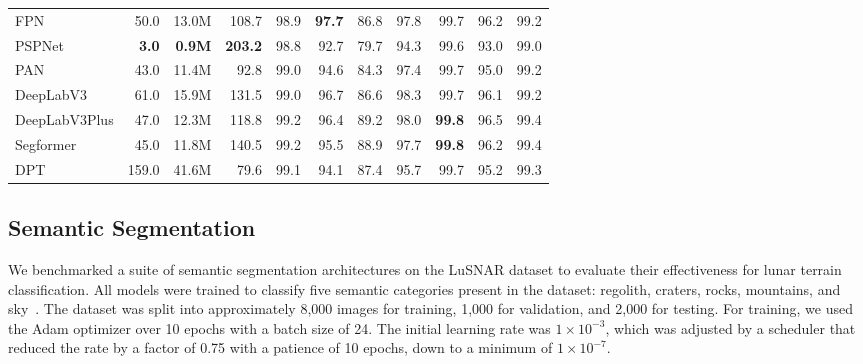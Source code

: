 \begin{table*}[h!]
\begin{tabular}{|l rrrrrrrrrr|}
		FPN                                                          & 50.0          & 13.0M         &
		108.7                                                        & 98.9          & \textbf{97.7} & 86.8          & 97.8          & 99.7          & 96.2          & 99.2          \\
		PSPNet                                                       & \textbf{3.0}  & \textbf{0.9M} &
		\textbf{203.2}                                               & 98.8          & 92.7          & 79.7          & 94.3          & 99.6          & 93.0          & 99.0          \\
		PAN                                                          & 43.0          & 11.4M         &
		92.8                                                         & 99.0          & 94.6          & 84.3          & 97.4          & 99.7          & 95.0          & 99.2          \\
		DeepLabV3                                                    & 61.0          & 15.9M         &
		131.5                                                        & 99.0          & 96.7          & 86.6          & 98.3          & 99.7          & 96.1          & 99.2          \\
		DeepLabV3Plus                                                & 47.0          & 12.3M         &
		118.8                                                        & 99.2          & 96.4          & 89.2          & 98.0          & \textbf{99.8} & 96.5          & 99.4          \\
		Segformer                                                    & 45.0          & 11.8M         &
		140.5                                                        & 99.2          & 95.5          & 88.9          & 97.7          & \textbf{99.8} & 96.2          & 99.4          \\
		DPT                                                          & 159.0         & 41.6M         &
		79.6                                                         & 99.1          & 94.1          & 87.4          & 95.7          & 99.7          & 95.2          & 99.3          \\
		\hline
	\end{tabular}
\end{table*}

\subsection{Semantic Segmentation}
We benchmarked a suite of semantic segmentation architectures on the LuSNAR dataset to evaluate their effectiveness for lunar terrain classification. All models were trained to classify five semantic categories present in the dataset: regolith, craters, rocks, mountains, and sky~\cite{liu_lusnarlunar_2024}. The dataset was split into approximately 8,000 images for training, 1,000 for validation, and 2,000 for testing. For training, we used the Adam optimizer over 10 epochs with a batch size of 24. The initial learning rate was $1\times10^{-3}$, which was adjusted by a scheduler that reduced the rate by a factor of 0.75 with a patience of 10 epochs, down to a minimum of $1\times10^{-7}$.


